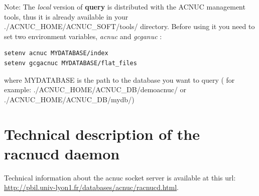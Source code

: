 \documentclass{article}
\begin{document}
\begin{figure}
\end{figure}


Note:
The \textit{local} version of \textbf{query} is distributed with the ACNUC management  tools,
 thus it is already available in your ./ACNUC\_HOME/ACNUC\_SOFT/tools/ directory.
Before using it you need to set two environment  variables, \textit{acnuc} and \textit{gcganuc} :
\begin{verbatim}
setenv acnuc MYDATABASE/index
setenv gcgacnuc MYDATABASE/flat_files 
\end{verbatim}

where MYDATABASE is the path to the database you want to query ( for example: ./ACNUC\_HOME/ACNUC\_DB/demoacnuc/
 or ./ACNUC\_HOME/ACNUC\_DB/mydb/)
  
 




\section{Technical description of the racnucd daemon}
Technical information about the acnuc socket server is available at this url:
\url{http://pbil.univ-lyon1.fr/databases/acnuc/racnucd.html}.
\end{document}
